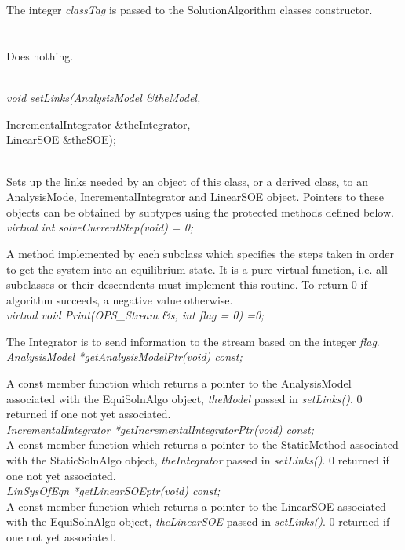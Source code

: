  \\ 
\\ 
The integer {\em classTag} is passed to the SolutionAlgorithm classes
constructor. \\

 \\
\\ 
Does nothing. \\


  \\
{\em void setLinks(AnalysisModel \&theModel, 

\indent\indent\indent\indent IncrementalIntegrator \&theIntegrator, \\
\indent\indent\indent\indent LinearSOE \&theSOE);} \\
Sets up the links needed by an object of this class, or a derived
class, to an AnalysisMode, IncrementalIntegrator and LinearSOE
object. Pointers to these objects can be obtained by subtypes using
the protected methods defined below. \\ 

{\em virtual int solveCurrentStep(void) = 0;} 

A method implemented by each subclass which specifies the steps taken
in order to get the system into an equilibrium state. It is a pure
virtual function, i.e. all subclasses or their descendents must
implement this routine. To return $0$ if algorithm succeeds, a negative
value otherwise. \\ 

{\em virtual void Print(OPS_Stream \&s, int flag = 0) =0;}

The Integrator is to send information to the stream based on the
integer {\em flag}. \\

{\em AnalysisModel *getAnalysisModelPtr(void) const;} 

A const member function which returns a pointer to the AnalysisModel
associated with the EquiSolnAlgo object, {\em theModel} passed in {\em
setLinks()}. $0$ returned if one not yet associated. \\

{\em IncrementalIntegrator *getIncrementalIntegratorPtr(void) const;} \\
A const member function which returns a pointer to the StaticMethod
associated with the StaticSolnAlgo object, {\em theIntegrator} passed
in {\em setLinks()}. $0$ returned if one not yet associated. \\
 
{\em LinSysOfEqn *getLinearSOEptr(void) const;} \\
A const member function which returns a pointer to the LinearSOE
associated with the EquiSolnAlgo object, {\em theLinearSOE} passed in
{\em setLinks()}. $0$ returned if one not yet associated. \\





